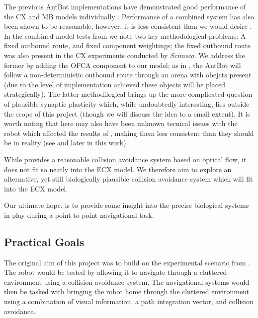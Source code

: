 \documentclass[a4paper,11pt,twoside,openright]{article}
\begin{document}
The previous AntBot implementations have demonstrated good performance
of the CX and MB models individually \cite{Scimeca2017,
  Mitchell2018}. Performance of a combined system has also been shown
to be reasonable, however, it is less consistent than we would desire
\cite{Zhang2017}. In the combined model tests from \cite{Zhang2017} we
note two key methodological problems: A fixed outbound route, and
fixed component weightings; the fixed outbound route was also present
in the CX experiments conducted by \textit{Scimeca}. We address the
former by adding the OFCA component to our model; as in
\cite{Mitchell2018}, the AntBot will follow a non-deterministic
outbound route through an arena with obejcts present (due to the level
of implementation achieved these objects will be placed
strategically). The latter methodilogical brings up the
more complicated question of plausible synaptic plasticity which,
while undoubtedly interesting, lies outside the scope of this project
(though we will discuss the idea to a small extent). It is worth
noting that here may also have been unknown tecnical issues with the
robot which affected the results of \cite{Zhang2017}, making them less
consistent than they should be in reality (see \cite{Mitchell2018} and
later in this work).
\newline
\par

While \cite{Mitchell2018} provides a reasonable collision avoidance system
based on optical flow, it does not fit so neatly into the ECX model. We therefore
aim to explore an alternative, yet still biologically plausible collision
avoidance system which will fit into the ECX model.
\newline
\par

Our ultimate hope, is to provide some insight into the precise biological
systems in play during a point-to-point navigational task.

\subsection { Practical Goals }
The original aim of this project was to build on the experimental
scenario from \cite{Mitchell2018}. The robot would be tested by
allowing it to navigate through a cluttered environment using a
collision avoidance system. The navigational systems would then be
tasked with bringing the robot home through the cluttered environment
using a combination of visual information, a path integration vector,
and collision avoidance.
\newline
\par
\end{document}
